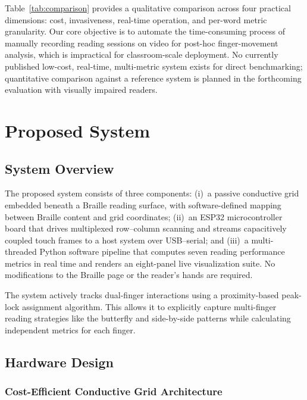 \documentclass[conference]{IEEEtran}
\begin{document}
    Table~\ref{tab:comparison} provides a qualitative comparison across four practical dimensions: cost, invasiveness, real-time operation, and per-word metric granularity. Our core objective is to automate the time-consuming process of manually recording reading sessions on video for post-hoc finger-movement analysis, which is impractical for classroom-scale deployment. No currently published low-cost, real-time, multi-metric system exists for direct benchmarking; quantitative comparison against a reference system is planned in the forthcoming evaluation with visually impaired readers.

    \section{Proposed System}
    \label{sec:solution}

    \subsection{System Overview}

    The proposed system consists of three components:
    (i)~a passive conductive grid embedded beneath a Braille reading
    surface, with software-defined mapping between Braille content and
    grid coordinates;
    (ii)~an ESP32 microcontroller board that drives multiplexed
    row--column scanning and streams capacitively coupled touch frames to
    a host system over USB--serial; and 
    (iii)~a multi-threaded Python
    software pipeline that computes seven reading performance metrics in
    real time and renders an eight-panel live visualization suite. No
    modifications to the Braille page or the reader's hands are required.

    The system actively tracks dual-finger interactions using a proximity-based peak-lock assignment algorithm. This allows it to explicitly capture multi-finger reading strategies like the butterfly and side-by-side patterns while calculating independent metrics for each finger.

    \subsection{Hardware Design}

\subsubsection{Cost-Efficient Conductive Grid Architecture}
\end{document}
